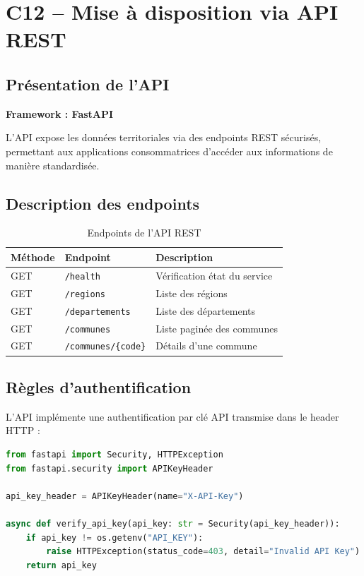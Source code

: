 \documentclass[12pt,a4paper]{article}
\begin{document}
\section{C12 -- Mise à disposition via API REST}

\subsection{Présentation de l'API}

\textbf{Framework : FastAPI}

L'API expose les données territoriales via des endpoints REST sécurisés, permettant aux applications consommatrices d'accéder aux informations de manière standardisée.

\subsection{Description des endpoints}

\begin{table}[H]
\centering
\begin{tabular}{L{2cm} L{4.5cm} L{7cm}}
    \toprule
    \textbf{Méthode} & \textbf{Endpoint} & \textbf{Description} \\
    \midrule
    GET & \texttt{/health} & Vérification état du service \\
    GET & \texttt{/regions} & Liste des régions \\
    GET & \texttt{/departements} & Liste des départements \\
    GET & \texttt{/communes} & Liste paginée des communes \\
    GET & \texttt{/communes/\{code\}} & Détails d'une commune \\
    \bottomrule
\end{tabular}
\caption{Endpoints de l'API REST}
\end{table}

\subsection{Règles d'authentification}

L'API implémente une authentification par clé API transmise dans le header HTTP :

\begin{lstlisting}[language=Python]
from fastapi import Security, HTTPException
from fastapi.security import APIKeyHeader

api_key_header = APIKeyHeader(name="X-API-Key")

async def verify_api_key(api_key: str = Security(api_key_header)):
    if api_key != os.getenv("API_KEY"):
        raise HTTPException(status_code=403, detail="Invalid API Key")
    return api_key
\end{lstlisting}
\end{document}
